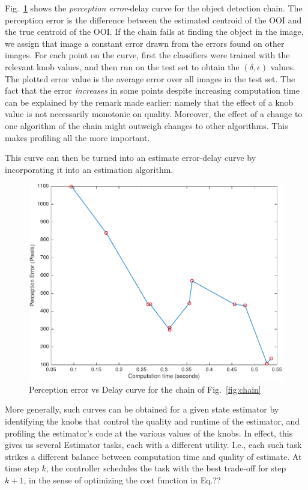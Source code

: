 Fig.~\ref{fig:chainErrorDelay} shows the \emph{perception error}-delay curve for the object detection chain.
The perception error is the difference between the estimated centroid of the OOI and the true centroid of the OOI.
If the chain fails at finding the object in the image, we assign that image a constant error drawn from the errors found on other images.
For each point on the curve, first the classifiers were trained with the relevant knob values, and then run on the test set to obtain the $(\delta,\epsilon)$ values.
The plotted error value is the average error over all images in the test set.
The fact that the error \emph{increases} in some points despite increasing computation time can be explained by the remark made earlier: namely that the effect of a knob value is not necessarily monotonic on quality.
Moreover, the effect of a change to one algorithm of the chain might outweigh changes to other algorithms.
This makes profiling all the more important.

This curve can then be turned into an estimate error-delay curve by incorporating it into an estimation algorithm.
\begin{figure}[t]
	\centering
	\includegraphics[width=0.7\linewidth]{figures/chainErrorDelay}
	\caption{Perception error vs Delay curve for the chain of Fig.~\ref{fig:chain}}
	\label{fig:chainErrorDelay}
\end{figure}
More generally, such curves can be obtained for a given state estimator by identifying the knobs that control the quality and runtime of the estimator, and profiling the estimator's code at the various values of the knobs.
In effect, this gives us several Estimator tasks, each with a different utility. 
I.e., each such task strikes a different balance between computation time and quality of estimate.
At time step $k$, the controller schedules the task with the best trade-off for step $k+1$, in the sense of optimizing the cost function in Eq.??

